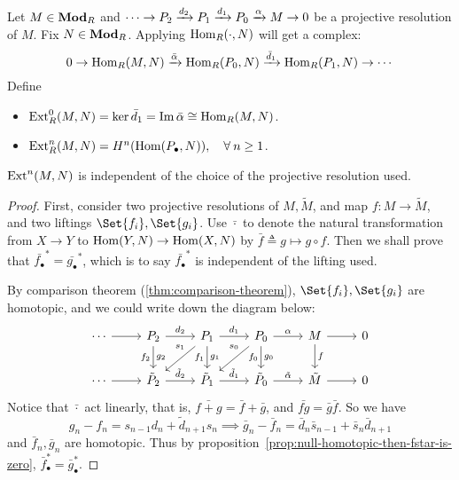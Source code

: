 \begin{definition}
  Let $M \in \mathbf{Mod}_R$ and $\dotsm \to P_2 \xrightarrow{d_2} P_1 \xrightarrow{d_1} P_0 \xrightarrow{\alpha} M \to 0$
  be a projective resolution of $M$. Fix $N \in \mathbf{Mod}_R$. Applying $\operatorname{Hom}_R(\cdot, N)$ will
  get a complex:
  \[
    0 \to \operatorname{Hom}_R(M, N) \xrightarrow{\bar \alpha} \operatorname{Hom}_R(P_0, N) \xrightarrow{\bar d_1}
    \operatorname{Hom}_R(P_1, N) \to \dotsm
  \]
  Define
  \begin{itemize}
    \item $\operatorname{Ext}^0_R(M, N) = \ker \bar d_1 = \operatorname{Im} \bar \alpha \cong \operatorname{Hom}_R(M, N)$.
    \item $\Ext^n_R(M, N) = H^n(\Hom(P_\bullet, N)), \quad \forall n \ge 1$.
  \end{itemize}
\end{definition}

\begin{theorem}
  $\operatorname{Ext}^n(M, N)$ is independent of the choice of the projective resolution used.

  \begin{proof}
    First, consider two projective resolutions of $M, \tilde{M}$, and map $f: M \to \tilde{M}$,
    and two liftings $\Set{f_i}, \Set{g_i}$. Use $\bar{\cdot}$ to
    denote the natural transformation from $X \to Y$ to $\operatorname{Hom}(Y, N) \to \operatorname{Hom}(X, N)$
    by $\bar{f} \triangleq g \mapsto g \circ f$. Then we shall prove that
    $\bar{f_\bullet}^* = \bar{g_\bullet}^*$, which is to say
    $\bar{f_\bullet}^*$ is independent of the lifting used.

    By comparison theorem (\ref{thm:comparison-theorem}), $\Set{f_i}, \Set{g_i}$ are homotopic,
    and we could write down the diagram below:
    \[
      \begin{tikzcd}
        \dotsm \ar[r] & P_2 \ar[r, "d_2"] \ar[d, "g_2", "f_2"']
                      & P_1 \ar[r, "d_1"] \ar[d, "g_1", "f_1"'] \ar[ld, "s_1"' near start]
                      & P_0 \ar[r, "\alpha"] \ar[d, "f_0"', "g_0"] \ar[ld, "s_0"' near start]
                      & M \ar[r] \ar[d, "f"] & 0 \\
        \dotsm \ar[r] & \tilde P_2 \ar[r, "\tilde d_2"]
                      & \tilde P_1 \ar[r, "\tilde d_1"]
                      & \tilde P_0 \ar[r, "\tilde\alpha"]
                      & \tilde M \ar[r] & 0
      \end{tikzcd}
    \]
    Notice that $\bar{\cdot}$ act linearly, that is, $\bar{f + g} = \bar{f} + \bar{g}$,
    and $\bar{fg} = \bar{g} \bar{f}$.
    So we have
    \[ g_n - f_n = s_{n-1} d_n + \tilde d_{n+1} s_n \implies
      \bar g_n - \bar f_n = \bar d_n \bar s_{n-1} + \bar s_n \bar d_{n+1} \]
    and $\bar f_n, \bar g_n$ are homotopic.
    Thus by proposition~\ref{prop:null-homotopic-then-fstar-is-zero},
    $\bar f_\bullet^* = \bar g_\bullet^*$.


\end{proof}
\end{theorem}
